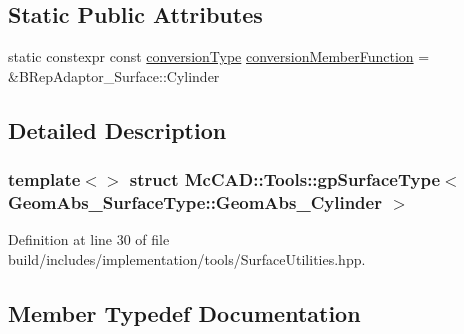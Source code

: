 \subsection*{Static Public Attributes}
\begin{DoxyCompactItemize}
\item 
static constexpr const \hyperlink{structMcCAD_1_1Tools_1_1gpSurfaceType_3_01GeomAbs__SurfaceType_1_1GeomAbs__Cylinder_01_4_aeb0860ae6aba6767a3c8eecc5089087c}{conversion\+Type} \hyperlink{structMcCAD_1_1Tools_1_1gpSurfaceType_3_01GeomAbs__SurfaceType_1_1GeomAbs__Cylinder_01_4_a3f2b735f93349bc3a142d121e7aea29c}{conversion\+Member\+Function} = \&B\+Rep\+Adaptor\+\_\+\+Surface\+::\+Cylinder
\end{DoxyCompactItemize}


\subsection{Detailed Description}
\subsubsection*{template$<$$>$\newline
struct Mc\+C\+A\+D\+::\+Tools\+::gp\+Surface\+Type$<$ Geom\+Abs\+\_\+\+Surface\+Type\+::\+Geom\+Abs\+\_\+\+Cylinder $>$}



Definition at line 30 of file build/includes/implementation/tools/\+Surface\+Utilities.\+hpp.



\subsection{Member Typedef Documentation}
\mbox{\label{structMcCAD_1_1Tools_1_1gpSurfaceType_3_01GeomAbs__SurfaceType_1_1GeomAbs__Cylinder_01_4_aeb0860ae6aba6767a3c8eecc5089087c}} 
